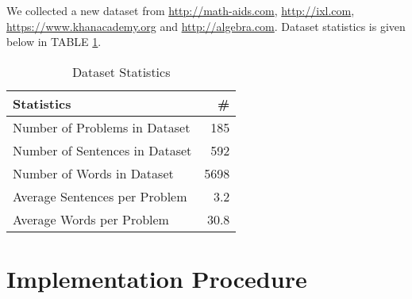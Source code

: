 \documentclass[document.tex]{subfiles}
\begin{document}
We collected a new dataset from \url{http://math-aids.com}, \url{http://ixl.com}, \url{https://www.khanacademy.org} and \url{http://algebra.com}. Dataset statistics is given below in TABLE \ref{tab:datasetstat}.

\begin{table}[H]
	\caption{Dataset Statistics}
	\begin{center}
		\begin{tabular}{|l | r|}
			\hline
			\textbf{Statistics}& \# \\ \hline
			Number of Problems in Dataset& 185 \\
			Number of Sentences in Dataset& 592\\
			Number of Words in Dataset& 5698\\
			Average Sentences per Problem& 3.2\\
			Average Words per Problem& 30.8\\
			\hline
		\end{tabular}
	\end{center}
	\label{tab:datasetstat}
\end{table}

\section{Implementation Procedure}
\end{document}
